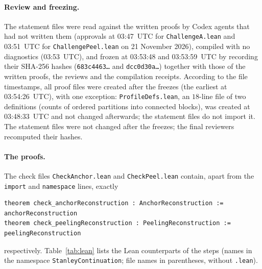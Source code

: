 \documentclass[11pt]{article}
\theoremstyle{definition}
\theoremstyle{remark}
\begin{document}
{\paragraph{Review and freezing.} The statement files were read against the
written proofs by Codex agents that had not written them (approvals at
03:47~UTC for \texttt{ChallengeA.lean} and 03:51~UTC for
\texttt{ChallengePeel.lean} on 21 November 2026), compiled with no diagnostics
(03:53~UTC), and frozen at 03:53:48 and 03:53:59~UTC by recording their SHA-256
hashes (\texttt{683c4463\ldots} and \texttt{dcc0d30a\ldots}) together with those
of the written proofs, the reviews and the compilation receipts. According to the
file timestamps, all proof files were created after the freezes (the earliest at
03:54:26~UTC), with one exception: \texttt{ProfileDefs.lean}, an $18$-line file
of two definitions (counts of ordered partitions into connected blocks), was
created at 03:48:33~UTC and not changed afterwards; the statement files do not
import it. The statement files were not changed after the freezes; the final
reviewers recomputed their hashes.

\paragraph{The proofs.} The check files \texttt{CheckAnchor.lean} and
\texttt{CheckPeel.lean} contain, apart from the \texttt{import} and
\texttt{namespace} lines, exactly
{\footnotesize
\begin{verbatim}
theorem check_anchorReconstruction : AnchorReconstruction := anchorReconstruction
theorem check_peelingReconstruction : PeelingReconstruction := peelingReconstruction
\end{verbatim}}
\noindent respectively. Table~\ref{tab:lean} lists the Lean counterparts of the
steps (names in the namespace \texttt{StanleyContinuation}; file names in
parentheses, without \texttt{.lean}).

}
\end{document}
